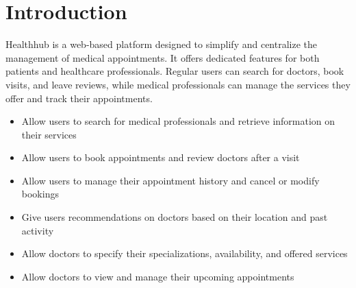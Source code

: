 \chapter{Introduction}
Healthhub is a web-based platform designed to simplify and centralize the management of medical appointments. It offers dedicated features for both patients and healthcare professionals. Regular users can search for doctors, book visits, and leave reviews, while medical professionals can manage the services they offer and track their appointments.

    \begin{itemize}
        \item Allow users to search for medical professionals and retrieve information on their services
        \item Allow users to book appointments and review doctors after a visit
        \item Allow users to manage their appointment history and cancel or modify bookings
        \item Give users recommendations on doctors based on their location and past activity
        \item Allow doctors to specify their specializations, availability, and offered services
        \item Allow doctors to view and manage their upcoming appointments
    \end{itemize}
